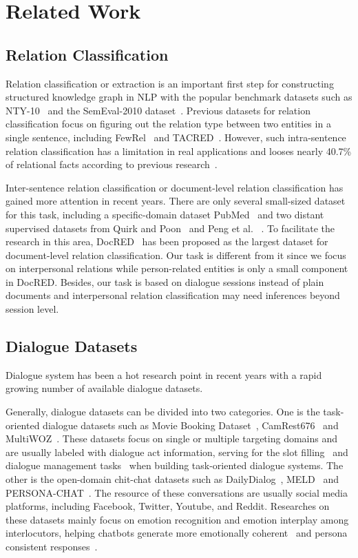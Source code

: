 \section{Related Work}

\subsection{Relation Classification}
Relation classification or extraction is an important first step for constructing structured knowledge graph in NLP with the popular benchmark datasets such as NTY-10~\cite{RiedelYM10} and the SemEval-2010 dataset~\cite{HendrickxKKNSPP10}. Previous datasets for relation classification focus on figuring out the relation type between two entities in a single sentence, including FewRel~\cite{HanZYWYLS18} and  TACRED~\cite{ZhangZCAM17}.  However, such intra-sentence relation classification has a limitation in real applications and looses nearly 40.7\% of relational facts according to previous research~\cite{SwampillaiS10,VergaSM18,YaoYLHLLLHZS19}.

Inter-sentence relation classification or document-level relation classification has gained more attention in recent years. There are only several small-sized dataset for this task, including a specific-domain dataset PubMed~\cite{LiSJSWLDMWL16} and two distant supervised datasets from Quirk and Poon~\cite{QuirkP17} and Peng et al. ~\cite{PengPQTY17}. To facilitate the research in this area, DocRED~\cite{YaoYLHLLLHZS19} has been proposed as the largest dataset for document-level relation classification. Our task is different from it since we focus on interpersonal relations while person-related entities is only a small component in DocRED. Besides, our task is based on dialogue sessions instead of plain documents and interpersonal relation classification may need inferences beyond session level.

\subsection{Dialogue Datasets}
Dialogue system has been a hot research point in recent years with a rapid growing number of available dialogue datasets. 

Generally, dialogue datasets can be divided into two categories. 
One is the task-oriented dialogue datasets such as Movie Booking Dataset~\cite{LiCLGC17}, CamRest676~\cite{UltesRSVKCBMWGY17} and MultiWOZ~\cite{BudzianowskiWTC18}. These datasets focus on single or multiple targeting domains and are usually labeled with dialogue act information, serving for the slot filling~\cite{LiuWXF20} and dialogue management tasks~\cite{BudzianowskiV19} when building task-oriented dialogue systems.
The other is the open-domain chit-chat datasets such as DailyDialog~\cite{LiSSLCN17}, MELD~\cite{PoriaHMNCM19} and PERSONA-CHAT~\cite{KielaWZDUS18}. The resource of these conversations are usually social media platforms, including Facebook, Twitter, Youtube, and Reddit. Researches on these datasets mainly focus on emotion recognition and emotion interplay among interlocutors, helping chatbots generate more emotionally coherent~\cite{GhosalMPCG19} and persona consistent responses~\cite{ZhengZHM20}.

